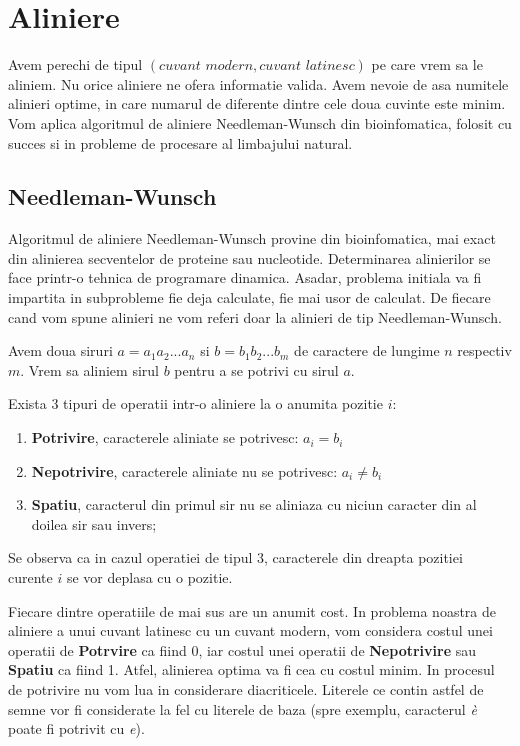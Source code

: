 \section{Aliniere}
Avem perechi de tipul $(\textit{cuvant modern}, \textit{cuvant latinesc})$ pe care vrem sa le aliniem.
Nu orice aliniere ne ofera informatie valida. Avem nevoie de asa numitele alinieri optime, in care
numarul de diferente dintre cele doua cuvinte este minim. Vom aplica algoritmul de aliniere 
Needleman-Wunsch\cite{needle} din bioinfomatica, folosit cu succes si in probleme de procesare al
limbajului natural. 

\subsection{Needleman-Wunsch}
Algoritmul de aliniere Needleman-Wunsch provine din bioinfomatica, mai exact din alinierea secventelor
de proteine sau nucleotide. Determinarea alinierilor se face printr-o tehnica
de programare dinamica. Asadar, problema initiala va fi impartita in subprobleme fie deja calculate,
fie mai usor de calculat. De fiecare cand vom spune alinieri ne vom referi doar la alinieri de tip
Needleman-Wunsch.

Avem doua siruri $a=a_1a_2...a_n$ si $b=b_1b_2...b_m$ de caractere de lungime $n$ respectiv $m$. 
Vrem sa aliniem sirul $b$ pentru a se potrivi cu sirul $a$.  

Exista 3 tipuri de operatii intr-o aliniere la o anumita pozitie $i$:
\begin{enumerate}
  \item \textbf{Potrivire}, caracterele aliniate se potrivesc: $a_i=b_i$
  \item \textbf{Nepotrivire}, caracterele aliniate nu se potrivesc: $a_i \neq b_i$
  \item \textbf{Spatiu}, caracterul din primul sir nu se aliniaza cu niciun caracter din al doilea sir
    sau invers;
\end{enumerate}

Se observa ca in cazul operatiei de tipul 3, caracterele din dreapta pozitiei curente $i$ se vor
deplasa cu o pozitie.

Fiecare dintre operatiile de mai sus are un anumit cost. In problema noastra de aliniere a unui
cuvant latinesc cu un cuvant modern, vom considera costul unei operatii de \textbf{Potrvire} ca fiind $0$,
iar costul unei operatii de \textbf{Nepotrivire} sau \textbf{Spatiu} ca fiind 1. Atfel, alinierea
optima va fi cea cu costul minim. In procesul de potrivire nu  vom lua in considerare diacriticele.
Literele ce contin astfel de semne vor fi considerate la fel cu literele de baza (spre exemplu,
caracterul \textit{\`{e}} poate fi potrivit cu \textit{e}).

